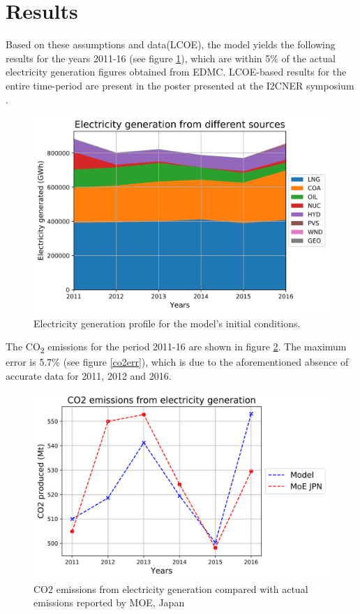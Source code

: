 \documentclass[14pt,a4paper]{article} %
\begin{document}
\section{Results}

Based on these assumptions and data(\gls{LCOE}), the model yields the following results for the years 2011-16 (see figure \ref{elcic}), which are within 5\% of the actual electricity generation figures obtained from \gls{EDMC}. \gls{LCOE}-based results for the entire time-period are present in the poster presented at the \gls{I2CNER} symposium \cite{chaube_dynamic_2019}.

\begin{figure}[H]
\centering
\includegraphics[scale=0.6]{elc-2016}
\caption{Electricity generation profile for the model's initial conditions.}
\label{elcic}
\end{figure}

The CO\textsubscript{2} emissions for the period 2011-16 are shown in figure \ref{co2ic}. The maximum error is 5.7\% (see figure \ref{co2err}), which is due to the aforementioned absence of accurate data for 2011, 2012 and 2016. 

\begin{figure}[H]
\centering
\includegraphics[scale=0.6]{co2-2016}
\caption{CO2 emissions from electricity generation compared with actual emissions reported by \gls{MOE}, Japan}
\label{co2ic}
\end{figure}
\end{document}
